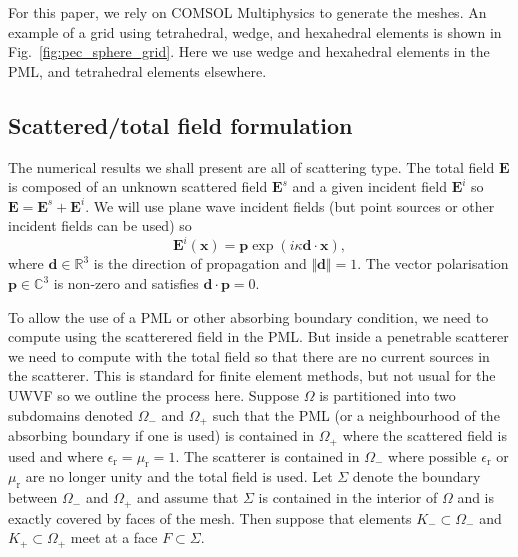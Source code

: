 \documentclass[a4paper,12pt]{article}
\newcommand{\bfE}{\mathbf{E}}
\newcommand{\bfp}{\mathbf{p}}
\newcommand{\bfx}{\mathbf{x}}
\newcommand{\bfd}{\mathbf{d}}
\newcommand{\epsr}{\epsilon_{\mathrm{r}}}
\newcommand{\mur}{\mu_{\mathrm{r}}}
\begin{document}
For this paper, we rely on COMSOL Multiphysics to generate the meshes. An example of a grid using tetrahedral, wedge, and hexahedral elements is shown in Fig.~\ref{fig:pec_sphere_grid}.  Here we use wedge and hexahedral elements in the PML, and tetrahedral elements elsewhere.
 
\subsection{Scattered/total field formulation}\label{stf}
  The numerical results we shall present are all of scattering type.  The total field $\bfE$ is 
  composed
of an unknown scattered field $\bfE^s$ and a given incident field $\bfE^i$ so $\bfE=\bfE^s+\bfE^i$.  We will use 
plane wave incident fields (but point sources or other incident fields can be used) so
\begin{equation}
\bfE^i(\bfx)=\bfp\exp(i\kappa\bfd\cdot\bfx),\label{Einc}
\end{equation}
where $\bfd\in \mathbb{R}^3$ is the direction of propagation and $\Vert\bfd\Vert=1$.  The vector polarisation $\bfp\in\mathbb{C}^3$ is non-zero and satisfies $\bfd\cdot\bfp=0$.

To allow the use of a PML or other absorbing boundary condition, we need to compute using the scatterered field in the PML.  But inside a penetrable scatterer we need to compute with the total field so that there are no current sources in the scatterer.  This is standard for finite element methods, but not usual for the UWVF so we outline the process here. Suppose $\Omega$ is partitioned into two subdomains denoted $\Omega_-$ and $\Omega_+$  such that the PML (or a neighbourhood
  of the absorbing boundary if one is used) is contained in $\Omega_+$ where the scattered field is used and where $\epsr=\mur=1$.  The scatterer is contained 
  in $\Omega_-$ where possible $\epsr$ or $\mur$  are no longer unity and the total field is used.  Let $\Sigma$ denote the boundary between 
  $\Omega_-$ and $\Omega_+$ and assume that $\Sigma$ is contained in the interior of $\Omega$ and is exactly covered by faces
  of the mesh.  Then suppose that elements $K_-\subset\Omega_-$ and $K_+\subset \Omega_+$ meet at a face $F\subset\Sigma$. 
\end{document}
